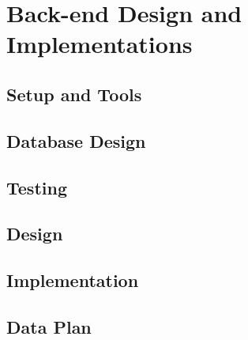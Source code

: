 \section{Back-end Design and Implementations}
\label{sec:sec03}


\subsection{Setup and Tools}
\label{subsubsec:dbsetup}


\subsection{Database Design}
\label{subsubsec:Database Design}


\subsection{Testing}
\label{subsubsec:dbtesting}
%

\subsection{Design}
\label{subsubsec:dbdesign}


\subsection{Implementation}
\label{subsubsec:dbimplementation}


\subsection{Data Plan}
\label{subsubsec:dbdataplan}
%
